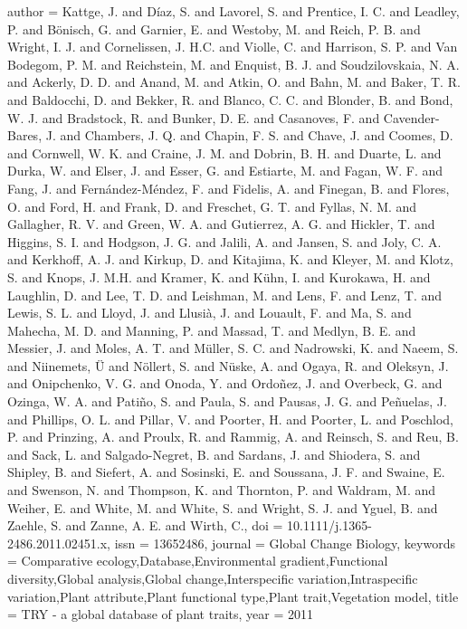 {{{{author = {Kattge, J. and D{\'{i}}az, S. and Lavorel, S. and Prentice, I. C. and Leadley, P. and B{\"{o}}nisch, G. and Garnier, E. and Westoby, M. and Reich, P. B. and Wright, I. J. and Cornelissen, J. H.C. and Violle, C. and Harrison, S. P. and {Van Bodegom}, P. M. and Reichstein, M. and Enquist, B. J. and Soudzilovskaia, N. A. and Ackerly, D. D. and Anand, M. and Atkin, O. and Bahn, M. and Baker, T. R. and Baldocchi, D. and Bekker, R. and Blanco, C. C. and Blonder, B. and Bond, W. J. and Bradstock, R. and Bunker, D. E. and Casanoves, F. and Cavender-Bares, J. and Chambers, J. Q. and Chapin, F. S. and Chave, J. and Coomes, D. and Cornwell, W. K. and Craine, J. M. and Dobrin, B. H. and Duarte, L. and Durka, W. and Elser, J. and Esser, G. and Estiarte, M. and Fagan, W. F. and Fang, J. and Fern{\'{a}}ndez-M{\'{e}}ndez, F. and Fidelis, A. and Finegan, B. and Flores, O. and Ford, H. and Frank, D. and Freschet, G. T. and Fyllas, N. M. and Gallagher, R. V. and Green, W. A. and Gutierrez, A. G. and Hickler, T. and Higgins, S. I. and Hodgson, J. G. and Jalili, A. and Jansen, S. and Joly, C. A. and Kerkhoff, A. J. and Kirkup, D. and Kitajima, K. and Kleyer, M. and Klotz, S. and Knops, J. M.H. and Kramer, K. and K{\"{u}}hn, I. and Kurokawa, H. and Laughlin, D. and Lee, T. D. and Leishman, M. and Lens, F. and Lenz, T. and Lewis, S. L. and Lloyd, J. and Llusi{\`{a}}, J. and Louault, F. and Ma, S. and Mahecha, M. D. and Manning, P. and Massad, T. and Medlyn, B. E. and Messier, J. and Moles, A. T. and M{\"{u}}ller, S. C. and Nadrowski, K. and Naeem, S. and Niinemets, {\"{U}} and N{\"{o}}llert, S. and N{\"{u}}ske, A. and Ogaya, R. and Oleksyn, J. and Onipchenko, V. G. and Onoda, Y. and Ordo{\~{n}}ez, J. and Overbeck, G. and Ozinga, W. A. and Pati{\~{n}}o, S. and Paula, S. and Pausas, J. G. and Pe{\~{n}}uelas, J. and Phillips, O. L. and Pillar, V. and Poorter, H. and Poorter, L. and Poschlod, P. and Prinzing, A. and Proulx, R. and Rammig, A. and Reinsch, S. and Reu, B. and Sack, L. and Salgado-Negret, B. and Sardans, J. and Shiodera, S. and Shipley, B. and Siefert, A. and Sosinski, E. and Soussana, J. F. and Swaine, E. and Swenson, N. and Thompson, K. and Thornton, P. and Waldram, M. and Weiher, E. and White, M. and White, S. and Wright, S. J. and Yguel, B. and Zaehle, S. and Zanne, A. E. and Wirth, C.},
doi = {10.1111/j.1365-2486.2011.02451.x},
issn = {13652486},
journal = {Global Change Biology},
keywords = {Comparative ecology,Database,Environmental gradient,Functional diversity,Global analysis,Global change,Interspecific variation,Intraspecific variation,Plant attribute,Plant functional type,Plant trait,Vegetation model},
title = {{TRY - a global database of plant traits}},
year = {2011}
}

}}}

